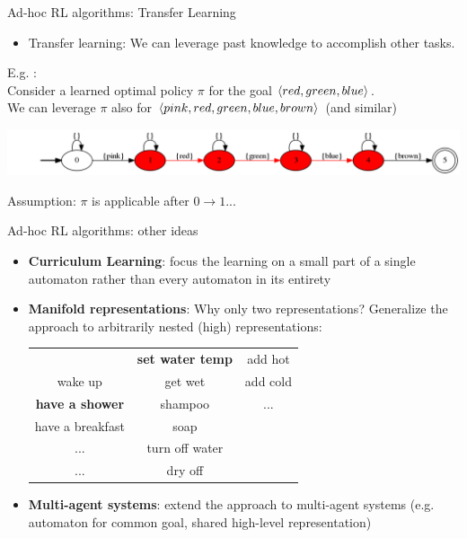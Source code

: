 \documentclass{beamer}
\begin{document}
\begin{frame}{Ad-hoc RL algorithms: Transfer Learning}
	\begin{itemize}
		\item Transfer learning: We can leverage past knowledge to accomplish other tasks.
	\end{itemize}
	E.g. \Sapientino:\\
	Consider a learned optimal policy $\pi$ for the goal $\langle red, green, blue \rangle$.\\
	We can leverage $\pi$ also for $\langle pink, red, green, blue, brown \rangle$ (and similar)
	
	\begin{center}
	\includegraphics[width=\textwidth]{images/sapientino-composite-dfa-horizontal}
	\end{center}
	
	Assumption: $\pi$ is applicable after $0 \rightarrow 1$...
\end{frame}

\begin{frame}{Ad-hoc RL algorithms: other ideas}

	\begin{itemize}
		\item \textbf{Curriculum Learning}: focus the learning on a small part of a single automaton rather than every automaton in its entirety
		\item \textbf{Manifold representations}: Why only two representations? Generalize the approach to arbitrarily nested (high) representations:
		
		\begin{table}
			\begin{tabular}{c | c | c}
				& \textbf{set water temp} 	& add hot\\
				wake up		 		      & get wet 				    & add cold\\
				\textbf{have a shower}	  & shampoo 				    & ...\\
				have a breakfast	  	  & soap 					    & \\
				...						  & turn off water 			    & \\
				...						  & dry off 				    & 
			\end{tabular}
		\end{table}
		
		\item \textbf{Multi-agent systems}: extend the approach to multi-agent systems (e.g. automaton for common goal, shared high-level representation)
	\end{itemize}
		
\end{frame}
\end{document}
